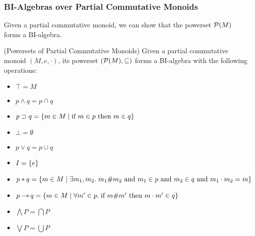 \subsubsection{BI-Algebras over Partial Commutative Monoids}

Given a partial commutative monoid, we can show that the powerset $\mathcal{P}(M)$ 
forms a BI-algebra. 

\begin{lemma}{(Powersets of Partial Commutative Monoids)}
Given a partial commutative monoid $(M, e, \cdot)$, its powerset
$(\mathcal{P}(M), \subseteq)$ forms a BI-algebra
with the following operations:

\begin{itemize}
\item $\top = M$
\item $p \land q = p \cap q$
\item $p \supset q = \{{m \in M \;|\;\mbox{if }m \in p \mbox{ then } m \in q}\}$
\item $\bot = \emptyset$ 
\item $p \vee q = p \cup q$
\item $I = \{{e}\}$
\item $p * q = \{{m \in M\;|\; \exists m_1, m_2.\; 
                       m_1 \# m_2 \mbox{ and } m_1 \in p \mbox{ and } m_2 \in q \mbox{ and } m_1\cdot m_2 = m}\}$
\item $p -\!\!*\, q = \{ m \in M \;|\; \forall m' \in p.\; \mbox{if } m \# m' \mbox{ then } m \cdot m' \in q \}$
\item $\bigwedge P = \bigcap P$ 
\item $\bigvee P = \bigcup P$
\end{itemize}
\end{lemma}


